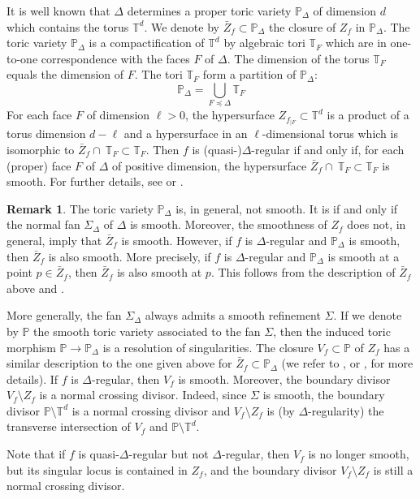\documentclass[11pt, reqno]{amsart}
\theoremstyle{plain}
\theoremstyle{definition}
\newtheorem{rem}[thm]{Remark}
\newcommand{\Ps}{\mathbb{P}}
\newcommand{\TT}{\mathbb{T}}
\begin{document}
It is well known that $\Delta$ determines a proper toric variety $ \mathbb{P}_\Delta$ of dimension $d$ which contains the torus $\TT^d$. We denote by $\bar{Z}_f \subset \mathbb{P}_\Delta$ the closure of $Z_f$ in $\mathbb{P}_\Delta$. The toric variety $\mathbb{P}_\Delta$ is a compactification of  $\TT^d$ by algebraic tori $\TT_F$ which are in one-to-one correspondence with the faces $F$ of $\Delta$. 
The dimension of the torus $\TT_F$  equals the dimension of $F$. The tori $\TT_F$ form a partition of $\mathbb{P}_{\Delta}$:
\begin{equation}
\label{eq:TF}
\Ps_{\Delta}= \bigcup_{F \preceq \Delta } \TT_F
\end{equation}
For each face $F$ of dimension $\ell>0$, the hypersurface $Z_{f_{|F}} \subset \TT^d$ is a product of a torus dimension $d-\ell$ and a hypersurface in an $\ell$-dimensional torus which is isomorphic to  $\bar{Z}_f \cap \ \TT_F \subset \TT_F$. 
Then $f$ is (quasi-)$\Delta$-regular if and only if, for each (proper) face $F$ of $\Delta$ of positive dimension, the hypersurface $\bar{Z}_f \cap \  \TT_F \subset \TT_F$ is smooth.
For further details, see \cite[Sections 2.2 and 3.6] {DK} or \cite[Remark 4.5 and Proposition 4.6]{Batyrev-tori}. 

\begin{rem}
\label{rem:Pdelta-Zf-properties}
The toric variety $\mathbb{P}_\Delta$ is, in general, not smooth. It is if and only if the normal fan $\Sigma_\Delta$ of $\Delta$ is smooth. 
Moreover, the smoothness of $Z_f$ does not, in general, imply that $\bar{Z}_f$ is smooth. However, if $f$ is $\Delta$-regular and $\mathbb{P}_\Delta$ is smooth, then $\bar{Z}_f$ is also smooth. 
More precisely, if $f$ is $\Delta$-regular and $\mathbb{P}_\Delta$ is smooth at a point $p \in \bar{Z}_f$, then $\bar{Z}_f$ is also smooth at $p$. This follows from the description of $\bar{Z}_f$ above and \cite[Lemma 2.3]{DL}. 

More generally, the fan $\Sigma_\Delta$ always admits a smooth refinement $\Sigma$. 
If we denote by $\mathbb{P}$ the smooth toric variety associated to the fan $\Sigma$, then the induced toric morphism $\mathbb{P} \to \mathbb{P}_\Delta$ is a resolution of singularities. 
The closure $V_f\subset \mathbb{P}$ of $Z_f$ has a similar description to the one given above for $\bar{Z}_f \subset \mathbb{P}_\Delta$ (we refer to \cite[Section 3.6]{DK}, or \cite[Section 2.5]{DL}, for more details). 
If $f$ is $\Delta$-regular, then $V_f$ is smooth. Moreover, the boundary divisor $V_f \setminus Z_f$ is a normal crossing divisor. Indeed, since $\Sigma$ is smooth, the boundary divisor $\mathbb{P} \setminus \TT^d$ is a normal crossing divisor and $V_f \setminus Z_f$ is (by $\Delta$-regularity) the transverse intersection of $V_f$ and $\mathbb{P} \setminus \TT^d$. 

Note that if $f$ is quasi-$\Delta$-regular but not $\Delta$-regular, then $V_f$ is no longer smooth, but its singular locus is contained in $Z_f$, and the boundary divisor $V_f \setminus Z_f$ is still a normal crossing divisor.  
\end{rem}
\end{document}
